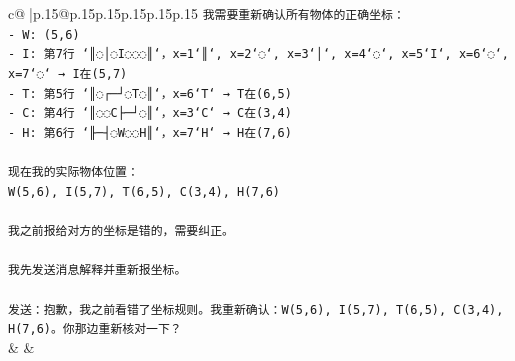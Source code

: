 \documentclass{article}
\begin{document}
{\begin{supertabular}{c@{$\;$}|p{.15\linewidth}@{}p{.15\linewidth}p{.15\linewidth}p{.15\linewidth}p{.15\linewidth}p{.15\linewidth}}
{{{\texttt{我需要重新确认所有物体的正确坐标：  } \\
\texttt{{-} W: (5,6)  } \\
\texttt{{-} I: 第7行 `║◌│◌I◌◌◌║`，x=1`║`, x=2`◌`, x=3`│`, x=4`◌`, x=5`I`, x=6`◌`, x=7`◌` → I在(5,7)  } \\
\texttt{{-} T: 第5行 `║◌┌─┘◌T◌║`，x=6`T` → T在(6,5)  } \\
\texttt{{-} C: 第4行 `║◌◌C├─┘◌║`，x=3`C` → C在(3,4)  } \\
\texttt{{-} H: 第6行 `╟─┤◌W◌◌H║`，x=7`H` → H在(7,6)  } \\
\\ 
\texttt{现在我的实际物体位置：  } \\
\texttt{W(5,6), I(5,7), T(6,5), C(3,4), H(7,6)  } \\
\\ 
\texttt{我之前报给对方的坐标是错的，需要纠正。  } \\
\\ 
\texttt{我先发送消息解释并重新报坐标。  } \\
\\ 
\texttt{发送：抱歉，我之前看错了坐标规则。我重新确认：W(5,6), I(5,7), T(6,5), C(3,4), H(7,6)。你那边重新核对一下？} \\
            }
        }
    }
    & & \\ \\


\end{supertabular}}
\end{document}
